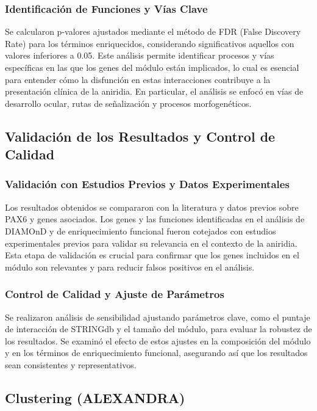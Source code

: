 \subsubsection{Identificación de Funciones y Vías Clave}

Se calcularon p-valores ajustados mediante el método de FDR (False Discovery Rate) para los términos enriquecidos, considerando significativos aquellos con valores inferiores a 0.05. Este análisis permite identificar procesos y vías específicas en las que los genes del módulo están implicados, lo cual es esencial para entender cómo la disfunción en estas interacciones contribuye a la presentación clínica de la aniridia. En particular, el análisis se enfocó en vías de desarrollo ocular, rutas de señalización y procesos morfogenéticos.

\subsection{Validación de los Resultados y Control de Calidad}
\subsubsection{Validación con Estudios Previos y Datos Experimentales}

Los resultados obtenidos se compararon con la literatura y datos previos sobre PAX6 y genes asociados. Los genes y las funciones identificadas en el análisis de DIAMOnD y de enriquecimiento funcional fueron cotejados con estudios experimentales previos para validar su relevancia en el contexto de la aniridia. Esta etapa de validación es crucial para confirmar que los genes incluidos en el módulo son relevantes y para reducir falsos positivos en el análisis.

\subsubsection{Control de Calidad y Ajuste de Parámetros}

Se realizaron análisis de sensibilidad ajustando parámetros clave, como el puntaje de interacción de STRINGdb y el tamaño del módulo, para evaluar la robustez de los resultados. Se examinó el efecto de estos ajustes en la composición del módulo y en los términos de enriquecimiento funcional, asegurando así que los resultados sean consistentes y representativos.

\subsection{Clustering (ALEXANDRA)}

